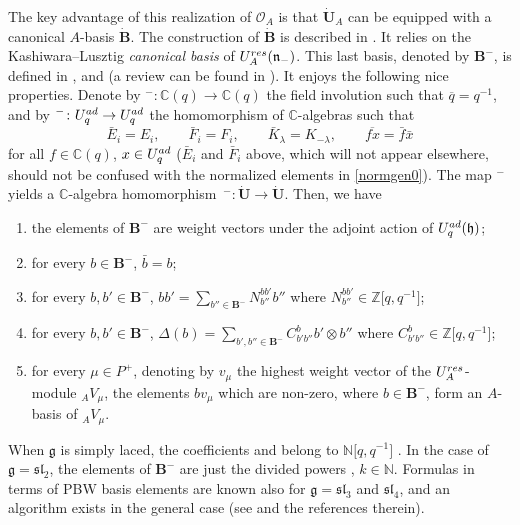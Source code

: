 \documentclass[11pt]{article}
\numberwithin{equation}{section}
\numberwithin{equation}{section}
\theoremstyle{definition}
\newcommand{\mc}{\mathbb{C}}
\newcommand{\mz}{\mathbb{Z}}
\newcommand{\mn}{\mathbb{N}}
\newcommand{\Oo}{{\mathcal O}}
\newcommand{\ra}{\rightarrow}
\begin{document}
The key advantage of this realization of $\Oo_A$ is that $\dot{\mathbf{U}}_A$ can be equipped with a canonical $A$-basis $\dot{\mathbf{B}}$. The construction of $\dot{\mathbf{B}}$ is described in \cite[Chapter~25]{Lusztig}. It relies on the Kashiwara--Lusztig {\it canonical basis} of $U_A^{\rm res}(\mathfrak{n}_-)$. This last basis, denoted by $\mathbf{B}^-$, is defined in \cite[Chapter~14]{Lusztig}, and \cite{Kashiwara1} (a review can be found in \cite[Chapter~14]{CP}). It enjoys the following nice properties. Denote by ${}^-\colon \mc(q) \ra \mc(q)$ the field involution such that $\overline{q} = q^{-1}$, and by ${}^-\colon U_q^{\rm ad} \ra U_q^{\rm ad}$ the homomorphism of $\mc$-algebras such that
\[\bar{E}_i = E_i,\qquad \bar{F}_i = F_i,\qquad \bar{K}_\lambda = K_{-\lambda},\qquad \overline{fx} = \bar{f}\bar{x}\]
for all $f\in \mc(q)$, $x\in U_q^{\rm ad}$ ($\bar{E}_i$ and $\bar{F}_i$ above, which will not appear elsewhere, should not be confused with the normalized elements in \eqref{normgen0}). The map ${}^-$ yields a $\mc$-algebra homomorphism~${{}^-\colon \dot{\mathbf{U}} \ra \dot{\mathbf{U}}}$. Then, we have
\begin{enumerate}\itemsep=0pt
\item[(1)] the elements of $\mathbf{B}^-$ are weight vectors under the adjoint action of $U_q^{\rm ad}(\mathfrak{h})$;
\item[(2)] for every $b\in \mathbf{B}^-$, $\bar{b} =b$;
\item[(3)] for every $b,b'\in \mathbf{B}^-$, $bb' = \sum_{b''\in \mathbf{B}^-} N^{bb'}_{b''} b''$ where $N^{bb'}_{b''}\in \mz\big[q,q^{-1}\big]$;
\item[(4)] for every $b,b'\in \mathbf{B}^-$, $\Delta(b) = \sum_{b',b''\in \mathbf{B}^-} C_{b'b''}^b b' \otimes b''$ where $C_{b'b''}^{b}\in \mz\big[q,q^{-1}\big]$;
\item[(5)] for every $\mu\in P^+$, denoting by $v_\mu$ the highest weight vector of the $U_A^{\rm res}$-module ${}_AV_\mu$, the elements $bv_\mu$ which are non-zero, where $b\in \mathbf{B}^-$, form an $A$-basis of ${}_AV_\mu$.
\end{enumerate}
When $\mathfrak{g}$ is simply laced, the coefficients  and  belong to $\mn\big[q,q^{-1}\big]$ \cite[Theorem~14.3.13]{Lusztig}. In the case of $\mathfrak{g}={\mathfrak{sl}_2}$, the elements of $\mathbf{B}^-$ are just the divided powers , $k\in \mn$. Formulas in terms of PBW basis elements are known also for $\mathfrak{g}=\mathfrak{sl}_3$ and $\mathfrak{sl}_4$, and an algorithm exists in the general case (see \cite{deGraaf} and the references therein).
\end{document}
